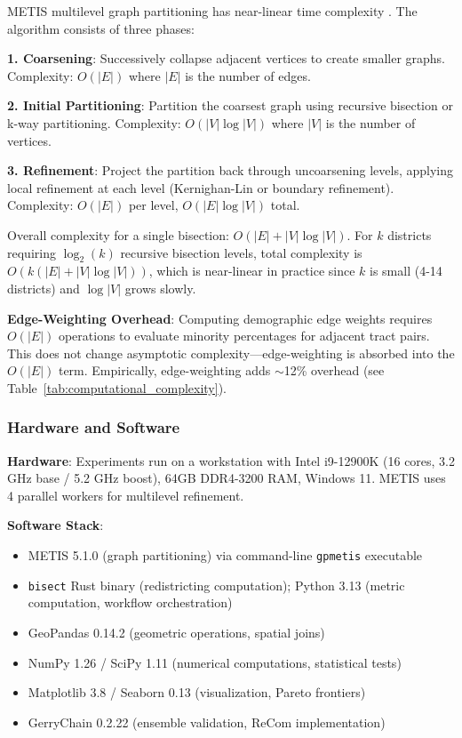 METIS multilevel graph partitioning has near-linear time complexity \citep{karypis1998}. The algorithm consists of three phases:

\textbf{1. Coarsening}: Successively collapse adjacent vertices to create smaller graphs. Complexity: $O(|E|)$ where $|E|$ is the number of edges.

\textbf{2. Initial Partitioning}: Partition the coarsest graph using recursive bisection or k-way partitioning. Complexity: $O(|V|\log|V|)$ where $|V|$ is the number of vertices.

\textbf{3. Refinement}: Project the partition back through uncoarsening levels, applying local refinement at each level (Kernighan-Lin or boundary refinement). Complexity: $O(|E|)$ per level, $O(|E|\log|V|)$ total.

Overall complexity for a single bisection: $O(|E| + |V|\log|V|)$. For $k$ districts requiring $\log_2(k)$ recursive bisection levels, total complexity is $O(k(|E| + |V|\log|V|))$, which is near-linear in practice since $k$ is small (4-14 districts) and $\log|V|$ grows slowly.

\textbf{Edge-Weighting Overhead}: Computing demographic edge weights requires $O(|E|)$ operations to evaluate minority percentages for adjacent tract pairs. This does not change asymptotic complexity---edge-weighting is absorbed into the $O(|E|)$ term. Empirically, edge-weighting adds $\sim$12\% overhead (see Table~\ref{tab:computational_complexity}).

\subsubsection{Hardware and Software}

\textbf{Hardware}: Experiments run on a workstation with Intel i9-12900K (16 cores, 3.2 GHz base / 5.2 GHz boost), 64GB DDR4-3200 RAM, Windows 11. METIS uses 4 parallel workers for multilevel refinement.

\textbf{Software Stack}:
\begin{itemize}
    \item METIS 5.1.0 (graph partitioning) via command-line \texttt{gpmetis} executable
    \item \texttt{bisect} Rust binary (redistricting computation); Python 3.13 (metric computation, workflow orchestration)
    \item GeoPandas 0.14.2 (geometric operations, spatial joins)
    \item NumPy 1.26 / SciPy 1.11 (numerical computations, statistical tests)
    \item Matplotlib 3.8 / Seaborn 0.13 (visualization, Pareto frontiers)
    \item GerryChain 0.2.22 (ensemble validation, ReCom implementation)
\end{itemize}

